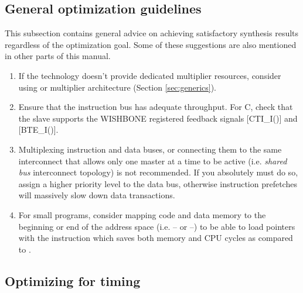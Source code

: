 \documentclass[a4paper,12pt,twoside,extrafontsizes]{memoir}
\begin{document}
\subsection{General optimization guidelines}

This subsection contains general advice on achieving satisfactory synthesis results regardless of the optimization goal. Some of these suggestions are also mentioned in other parts of this manual.

\begin{enumerate}
	\item If the technology doesn't provide dedicated multiplier resources, consider using  or  multiplier architecture (Section \ref{sec:generics}).
	
	\item Ensure that the instruction bus has adequate throughput. For \lxp{}C, check that the slave supports the WISHBONE registered feedback signals [CTI\_I()] and [BTE\_I()].
	
	\item Multiplexing instruction and data buses, or connecting them to the same interconnect that allows only one master at a time to be active (i.e. \emph{shared bus} interconnect topology) is not recommended. If you absolutely must do so, assign a higher priority level to the data bus, otherwise instruction prefetches will massively slow down data transactions.
	
	\item For small programs, consider mapping code and data memory to the beginning or end of the address space (i.e. -- or --) to be able to load pointers with the  instruction which saves both memory and CPU cycles as compared to .
\end{enumerate}

\subsection{Optimizing for timing}
\end{document}
